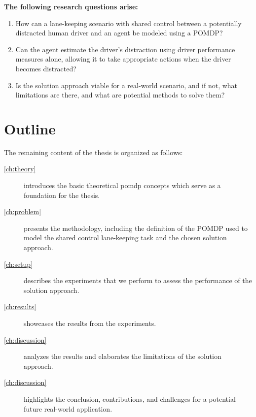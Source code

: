 \vspace{1em}
\noindent
\textbf{The following research questions arise:}
\begin{enumerate}
    \item How can a lane-keeping scenario with shared control between a potentially distracted human driver and an agent be modeled using a POMDP?
    \item Can the agent estimate the driver's distraction using driver performance measures alone, allowing it to take appropriate actions when the driver becomes distracted?
    \item Is the solution approach viable for a real-world scenario, and if not, what limitations are there, and what are potential methods to solve them?
\end{enumerate}

\section{Outline}

The remaining content of the thesis is organized as follows:
\begin{description}
    \item[\cref{ch:theory}] introduces the basic theoretical \gls{pomdp} concepts which serve as a foundation for the thesis.

    \item[\cref{ch:problem}]
    presents the methodology, including the definition of the POMDP used to model the shared control lane-keeping task and the chosen solution approach.
    
    \item[\cref{ch:setup}]
    describes the experiments that we perform to assess the performance of the solution approach.
    
    \item[\cref{ch:results}]
    showcases the results from the experiments.

    \item[\cref{ch:discussion}]
    analyzes the results and elaborates the limitations of the solution approach.

    \item[\cref{ch:discussion}]
    highlights the conclusion, contributions, and challenges for a potential future real-world application.

\end{description}